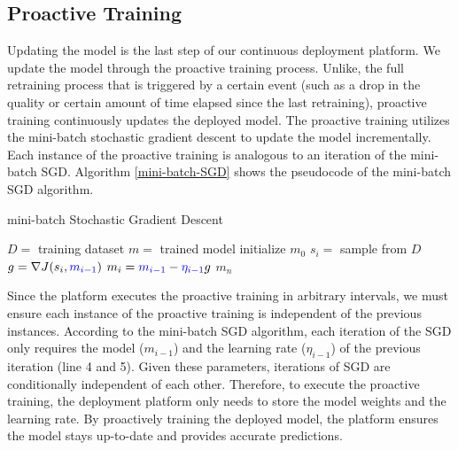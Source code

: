 
\subsection{Proactive Training}\label{proactive-training}
Updating the model is the last step of our continuous deployment platform.
We update the model through the proactive training process.
Unlike, the full retraining process that is triggered by a certain event (such as a drop in the quality or certain amount of time elapsed since the last retraining), proactive training continuously updates the deployed model.
The proactive training utilizes the mini-batch stochastic gradient descent to update the model incrementally.
Each instance of the proactive training is analogous to an iteration of the mini-batch SGD.
Algorithm \ref{mini-batch-SGD} shows the pseudocode of the mini-batch SGD algorithm.
\begin{algorithm}
\caption{mini-batch Stochastic Gradient Descent}\label{mini-batch-SGD}
\begin{algorithmic}[1]
\Require  $D=$ training dataset
\Ensure $m=$ trained model
\State initialize $m_0$
	\State $s_i =$ sample from $D$
	\State $g = \nabla J(s_i, \textcolor{blue}{m_{i-1}})$
	\State $m_i = \textcolor{blue}{m_{i-1}} - \textcolor{blue}{\eta_{i-1}}g$
\EndFor
\State \Return $m_n$
\end{algorithmic}
\end{algorithm}
Since the platform executes the proactive training in arbitrary intervals, we must ensure each instance of the proactive training is independent of the previous instances.
According to the mini-batch SGD algorithm, each iteration of the SGD only requires the model ($m_{i-1}$) and the learning rate ($\eta_{i-1}$) of the previous iteration (line 4 and 5).
Given these parameters, iterations of SGD are conditionally independent of each other.
Therefore, to execute the proactive training, the deployment platform only needs to store the model weights and the learning rate.
By proactively training the deployed model, the platform ensures the model stays up-to-date and provides accurate predictions.

